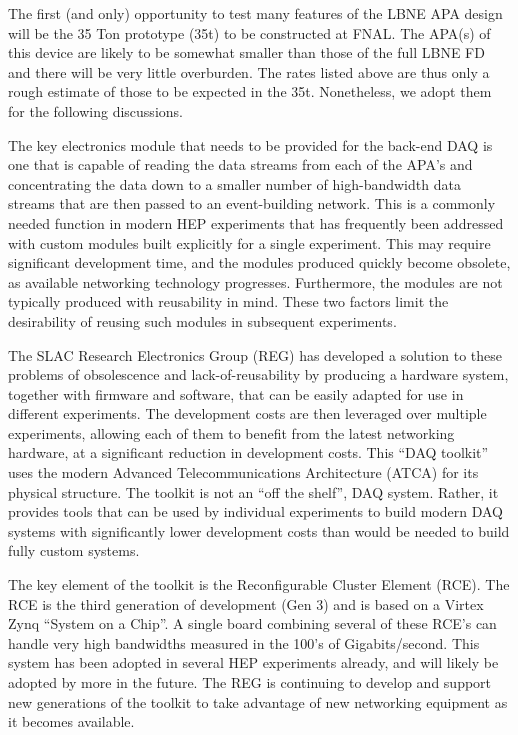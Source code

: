 The first (and only) opportunity to test many features of the LBNE APA 
design will be the 35 Ton prototype (35t) to be constructed at FNAL.
The APA(s) of this device are likely to be somewhat smaller than 
those of the full LBNE FD and there will be very little overburden.
The rates listed above are thus only a rough estimate of those to be
expected in the 35t.
Nonetheless, we adopt them for the following discussions.

The key electronics module that needs to be provided for the back-end DAQ is 
one that is capable of reading the data streams from each of the
APA's and concentrating the data down to a smaller number of high-bandwidth 
data streams that are then passed to an event-building network.
This is a commonly needed function in modern HEP experiments that has frequently 
been addressed with custom modules built explicitly for a single experiment.
This may require significant development time, and the modules produced quickly
become obsolete, as available networking technology progresses.
Furthermore, the modules are not typically produced with reusability
in mind.
These two factors limit the desirability of reusing such modules in 
subsequent experiments.

The SLAC Research Electronics Group (REG) has developed a solution to these 
problems of obsolescence and lack-of-reusability
by producing a hardware system, together with firmware and software, that can
be easily adapted for use in different experiments.
The development costs are then leveraged over multiple experiments, allowing 
each of them to benefit from the latest networking hardware, at a significant 
reduction in development costs. 
This ``DAQ toolkit'' uses the modern Advanced Telecommunications Architecture 
(ATCA) for its physical structure.
The toolkit is not an ``off the shelf'', DAQ system.
Rather, it provides tools that can be used by individual experiments to 
build modern DAQ systems with significantly lower development costs than
would be needed to build fully custom systems.

The key element of the toolkit is the Reconfigurable Cluster Element (RCE).
The RCE is the third generation of development (Gen 3) and is
based on a Virtex Zynq ``System on a Chip''.
A single board combining several of these RCE's can handle very high bandwidths 
measured in the 100's of Gigabits/second. 
This system has been adopted in several HEP experiments already, and will likely 
be adopted by more in the future. 
The REG is continuing to develop and support new generations 
of the toolkit to take advantage of new networking equipment as it becomes available.

